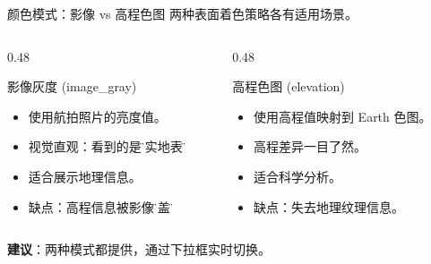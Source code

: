 \documentclass[aspectratio=169,11pt]{ctexbeamer}
\begin{document}
\begin{frame}{颜色模式：影像 vs 高程色图}
  两种表面着色策略各有适用场景。

  \begin{columns}
    \begin{column}{0.48\linewidth}
      \begin{block}{影像灰度 (image\_gray)}
        \begin{itemize}
          \item 使用航拍照片的亮度值。
          \item 视觉直观：看到的是\"真实地表\"。
          \item 适合展示地理信息。
          \item 缺点：高程信息被影像\"掩盖\"。
        \end{itemize}
      \end{block}
    \end{column}
    \begin{column}{0.48\linewidth}
      \begin{block}{高程色图 (elevation)}
        \begin{itemize}
          \item 使用高程值映射到 Earth 色图。
          \item 高程差异一目了然。
          \item 适合科学分析。
          \item 缺点：失去地理纹理信息。
        \end{itemize}
      \end{block}
    \end{column}
  \end{columns}

  \begin{center}
    \textbf{建议}：两种模式都提供，通过下拉框实时切换。
  \end{center}
\end{frame}
\end{document}
